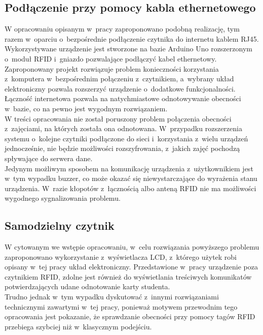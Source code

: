 \documentclass[declaration,shortabstract, mgr]{iithesis}
\begin{document}
\subsection{Podłączenie przy pomocy kabla ethernetowego}
\indent W opracowaniu opisanym w~pracy\cite{ethernet} zaproponowano podobną realizację, tym razem w~oparciu o~bezpośrednie podłączenie czytnika do internetu kablem RJ45. Wykorzystywane urządzenie jest stworzone na bazie Arduino Uno rozszerzonym o~moduł RFID i~gniazdo pozwalające podłączyć kabel ethernetowy. \\
\indent Zaproponowany projekt rozwiązuje problem konieczności korzystania z~komputera w~bezpośrednim połączeniu z~czytnikiem, a~wybrany układ elektroniczny pozwala rozszerzyć urządzenie o~dodatkowe funkcjonalności. Łączność internetowa pozwala na natychmiastowe odnotowywanie obecności w~bazie, co na pewno jest wygodnym rozwiązaniem. \\
\indent W treści opracowania nie został poruszony problem połączenia obecności z~zajęciami, na których została ona odnotowana. W~przypadku rozszerzenia systemu o~kolejne czytniki podłączone do sieci i~korzystania z~wielu urządzeń jednocześnie, nie będzie możliwości rozszyfrowania, z~jakich zajęć pochodzą spływające do serwera dane. \\
\indent Jedynym możliwym sposobem na komunikację urządzenia z~użytkownikiem jest w~tym wypadku buzzer, co może okazać się niewystarczające do wyrażenia stanu urządzenia. W~razie kłopotów z~łącznością albo anteną RFID nie ma możliwości wygodnego sygnalizowania problemu.

\subsection{Samodzielny czytnik }
\indent W cytowanym we wstępie opracowaniu\cite{lcd}, w~celu rozwiązania powyższego problemu zaproponowano wykorzystanie z~wyświetlacza LCD, z~którego użytek robi opisany w~tej pracy układ elektroniczny. Przedstawione w~pracy urządzenie poza czytnikiem RFID, zdolne jest również do wyświetlania treściwych komunikatów potwierdzających udane odnotowanie karty studenta. \\
\indent Trudno jednak w~tym wypadku dyskutować z~innymi rozwiązaniami technicznymi zawartymi w~tej pracy, ponieważ motywem przewodnim tego opracowania jest pokazanie, że sprawdzanie obecności przy pomocy tagów RFID przebiega szybciej niż w~klasycznym podejściu.
\end{document}
